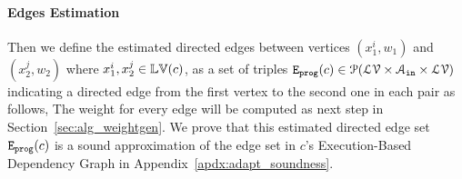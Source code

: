 \paragraph*{Edges Estimation}
Then we define the estimated directed edges
between vertices $({x}_1^{i}, w_1)$  
and $({x}_2^{j}, w_2)$ 
where ${x}_1^{i}, {x}_2^{j} \in \mathbb{LV}(c)$,
as a set of triples 
$\mathtt{{E_{prog}}}(c) \in \mathcal{P}(\mathcal{LV} \times \mathcal{A}_{\mathtt{in}} \times \mathcal{LV})$
indicating a directed edge from the first vertex to the second one in each pair
as follows,
The weight for every edge will be computed as next step in Section~\ref{sec:alg_weightgen}.
We prove that this estimated directed edge set $\mathtt{{E_{prog}}}(c)$ is a sound approximation of the 
edge set in $c$'s Execution-Based Dependency Graph 
in Appendix~\ref{apdx:adapt_soundness}.
